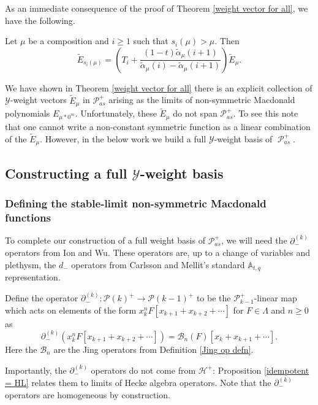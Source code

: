 \documentclass[ALCO,Unicode]{cedram}
\newcommand{\y}{{ \mathscr{Y} }}
\DeclareMathOperator{\sP}{\mathscr{P} }
\begin{document}
As an immediate consequence of the proof of Theorem \ref{weight vector for all}, we have the following. 

\begin{coro}\label{action of T on E mu}
    Let $\mu$ be a composition and $i \geq 1$ such that $s_i(\mu) > \mu$. Then 
    $$\widetilde{E}_{s_i(\mu)} = \left(T_i + \frac{(1-t)\widetilde{\alpha}_{\mu}(i+1)}{\widetilde{\alpha}_{\mu}(i) - \widetilde{\alpha}_{\mu}(i+1)}\right) \widetilde{E}_{\mu}.$$
\end{coro}

We have shown in Theorem \ref{weight vector for all} there is an explicit collection of $\mathscr{Y}$-weight vectors $\widetilde{E}_{\mu}$ in $\mathscr{P}_{as}^{+}$ arising as the limits of non-symmetric Macdonald polynomials $E_{\mu * 0^m}$. Unfortunately, these $\widetilde{E}_{\mu}$ do not span $\mathscr{P}_{as}^{+}$. To see this note that one cannot write a non-constant symmetric function as a linear combination of the $\widetilde{E}_{\mu}$. However, in the below work we build a full $\y$-weight basis of $\sP_{as}^{+}$. 

\subsection{Constructing a full \texorpdfstring{$\y$}{Y}-weight basis}

\subsubsection{Defining the stable-limit non-symmetric Macdonald functions}
 To complete our construction of a full weight basis of $\mathscr{P}_{as}^{+}$, we will need the $\partial_{-}^{(k)}$ operators from Ion and Wu. These operators are, up to a change of variables and plethysm, the $d_{-}$ operators from Carlsson and Mellit's standard $\mathbb{A}_{t,q}$ representation. 

\begin{defi} \label{defn7}
 Define the operator $\partial_{-}^{(k)}: \mathscr{P}(k)^{+} \rightarrow \mathscr{P}(k-1)^{+}$ to be the $\mathscr{P}_{k-1}^{+}$-linear map which acts on elements of the form $x_k^nF[x_{k+1}+x_{k+2}+ \cdots]$ for $F \in \Lambda$ and $n \geq 0$ as 
 $$\partial_{-}^{(k)}(x_k^nF[x_{k+1}+x_{k+2}+ \cdots]) = \mathscr{B}_n(F)[x_k + x_{k+1} + \cdots]. $$
 Here the $\mathscr{B}_n$ are the Jing operators from Definition \ref{Jing op defn}.
 
\end{defi}
 Importantly, the $\partial_{-}^{(k)}$ operators do not come from $\mathscr{H}^{+}$: Proposition \ref{idempotent = HL} relates them to limits of Hecke algebra operators. Note that the $\partial_{-}^{(k)}$ operators are homogeneous by construction. 
\end{document}
